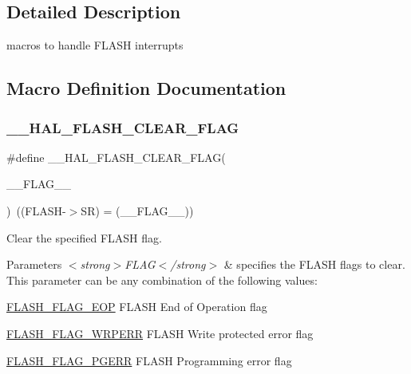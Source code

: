 \subsection{Detailed Description}
macros to handle F\+L\+A\+SH interrupts 



\subsection{Macro Definition Documentation}
\mbox{\label{group___f_l_a_s_h___interrupt_ga68e49c4675761e2ec35153e747de7622}} 
\subsubsection{\texorpdfstring{\+\_\+\+\_\+\+H\+A\+L\+\_\+\+F\+L\+A\+S\+H\+\_\+\+C\+L\+E\+A\+R\+\_\+\+F\+L\+AG}{\_\_HAL\_FLASH\_CLEAR\_FLAG}}
{\footnotesize\ttfamily \#define \+\_\+\+\_\+\+H\+A\+L\+\_\+\+F\+L\+A\+S\+H\+\_\+\+C\+L\+E\+A\+R\+\_\+\+F\+L\+AG(\begin{DoxyParamCaption}\item[{}]{\+\_\+\+\_\+\+F\+L\+A\+G\+\_\+\+\_\+ }\end{DoxyParamCaption})~((F\+L\+A\+SH-\/$>$SR) = (\+\_\+\+\_\+\+F\+L\+A\+G\+\_\+\+\_\+))}



Clear the specified F\+L\+A\+SH flag. 


\begin{DoxyParams}{Parameters}
{\em $<$strong$>$\+F\+L\+A\+G$<$/strong$>$} & specifies the F\+L\+A\+SH flags to clear. This parameter can be any combination of the following values\+: \begin{DoxyItemize}
\item \hyperlink{group___f_l_a_s_h___flag__definition_gaf043ba4d8f837350bfc7754a99fae5a9}{F\+L\+A\+S\+H\+\_\+\+F\+L\+A\+G\+\_\+\+E\+OP} F\+L\+A\+SH End of Operation flag \item \hyperlink{group___f_l_a_s_h___flag__definition_ga6abf64f916992585899369166db3f266}{F\+L\+A\+S\+H\+\_\+\+F\+L\+A\+G\+\_\+\+W\+R\+P\+E\+RR} F\+L\+A\+SH Write protected error flag \item \hyperlink{group___f_l_a_s_h___flag__definition_gae2ef62dee0a5ca01e6226746039b6f20}{F\+L\+A\+S\+H\+\_\+\+F\+L\+A\+G\+\_\+\+P\+G\+E\+RR} F\+L\+A\+SH Programming error flag \end{DoxyItemize}
\\
\hline
\end{DoxyParams}

